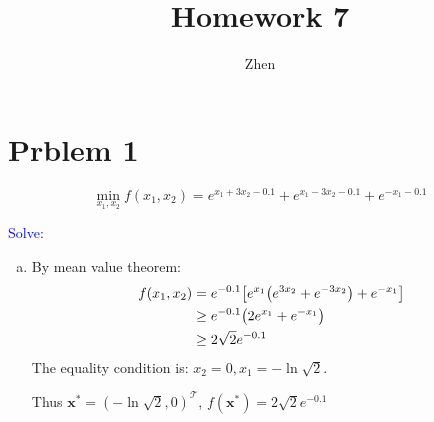 \documentclass{article}
\def\bx{\boldsymbol{x}}
\def\Esolve{\textcolor{blue}{Solve: }}
\begin{document}
\title{Homework 7}
\author{Zhen}
\maketitle

\section*{Prblem 1}
$$
\min_{x_1,x_2} f(x_1,x_2)=
e^{x_1+3x_2-0.1}+e^{x_1-3x_2-0.1}+e^{-x_1-0.1}
$$

\Esolve
\begin{enumerate}[(a)]
	\item 
		By mean value theorem:
		$$
		\begin{aligned}
			f(x_1,x_2)
			&=
			e^{-0.1}
			\qty[
				e^{x_1}\qty(e^{3x_2}+e^{-3x_2})+
				e^{-x_1}
			]
			\\&\ge
			e^{-0.1}
			\qty(2e^{x_1}+e^{-x_1})
			\\&\ge
			2\sqrt{2}e^{-0.1}
		\end{aligned}
		$$
		The equality condition is: 
		$x_2=0,x_1=-\ln\sqrt{2}$.

		Thus $\bx^*=(-\ln\sqrt{2},0)^{\mathcal{T}}$, 
		$f(\bx^*)=2\sqrt{2}e^{-0.1}$


\end{enumerate}
\end{document}
